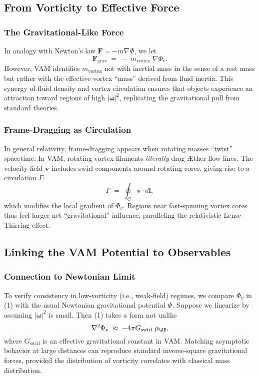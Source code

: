 \subsection{From Vorticity to Effective Force}
\subsubsection{The Gravitational-Like Force}

In analogy with Newton’s law \(\mathbf{F} = -m \nabla \Phi\), we let
\[
    \mathbf{F}_{\mathrm{grav}} \;=\; -\,m_{\mathrm{vortex}}\;\nabla \Phi_v.
\]
However, VAM identifies \(m_{\mathrm{vortex}}\) not with inertial mass in the sense of a rest mass but rather with the effective vortex “mass” derived from fluid inertia. This synergy of fluid density and vortex circulation ensures that objects experience an attraction toward regions of high \(\lvert \boldsymbol{\omega} \rvert^2\), replicating the gravitational pull from standard theories.

\subsubsection{Frame-Dragging as Circulation}

In general relativity, frame-dragging appears when rotating masses “twist” spacetime. In VAM, rotating vortex filaments \textit{literally} drag Æther flow lines. The velocity field \(\mathbf{v}\) includes swirl components around rotating cores, giving rise to a circulation \(\Gamma\):
\[
    \Gamma \;=\; \oint_C \mathbf{v}\cdot d\mathbf{l},
\]
which modifies the local gradient of \(\Phi_v\). Regions near fast-spinning vortex cores thus feel larger net “gravitational” influence, paralleling the relativistic Lense–Thirring effect.

\subsection{Linking the VAM Potential to Observables}

\subsubsection{Connection to Newtonian Limit}

To verify consistency in low-vorticity (i.e., weak-field) regimes, we compare \(\Phi_v\) in (1) with the usual Newtonian gravitational potential \(\Phi\). Suppose we linearize by assuming \(\lvert \boldsymbol{\omega} \rvert^2\) is small. Then (1) takes a form not unlike
\[
    \nabla^2 \Phi_v \;\approx\; -4\pi G_{\mathrm{swirl}}\;\rho_{\mathrm{\AE}},
\]
where \(G_{\mathrm{swirl}}\) is an effective gravitational constant in VAM. Matching asymptotic behavior at large distances can reproduce standard inverse-square gravitational forces, provided the distribution of vorticity correlates with classical mass distribution.

